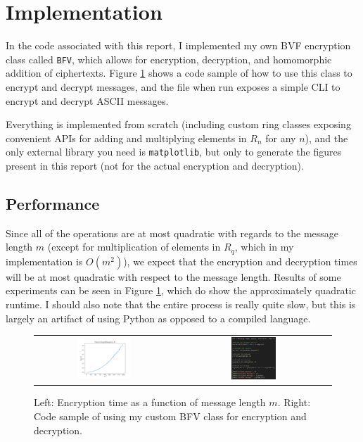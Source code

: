 \documentclass{theme}
\begin{document}
\section{Implementation}

In the code associated with this report, I implemented my own BVF encryption class called \texttt{BFV}, which allows for encryption, decryption, and homomorphic addition of ciphertexts. Figure \ref{fig:encryption-time} shows a code sample of how to use this class to encrypt and decrypt messages, and the file when run exposes a simple CLI to encrypt and decrypt ASCII messages.

Everything is implemented from scratch (including custom ring classes exposing convenient APIs for adding and multiplying elements in $R_n$ for any $n$), and the only external library you need is \texttt{matplotlib}, but only to generate the figures present in this report (not for the actual encryption and decryption).

\subsection{Performance}

Since all of the operations are at most quadratic with regards to the message length $m$ (except for multiplication of elements in $R_q$, which in my implementation is $O(m^2)$), we expect that the encryption and decryption times will be at most quadratic with respect to the message length. Results of some experiments can be seen in Figure \ref{fig:encryption-time}, which do show the approximately quadratic runtime. I should also note that the entire process is really quite slow, but this is largely an artifact of using Python as opposed to a compiled language.

\begin{figure}
    \centering
    \begin{tabular}{cc}
        \includegraphics[width=0.4\textwidth]{../src/graphs/time_vs_m.png}
         &
        \includegraphics[width=0.30\textwidth]{../src/graphs/code_sample.png}
    \end{tabular}

    \caption{Left: Encryption time as a function of message length $m$. Right: Code sample of using my custom BFV class for encryption and decryption.}
    \label{fig:encryption-time}
\end{figure}


\printbibliography
\end{document}
